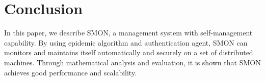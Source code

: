 \section{Conclusion}
\label{sec:conclusion}

In this paper, we describe SMON, a management system with
self-management capability. By using epidemic algorithm and
authentication agent, SMON can monitors and maintains itself
automatically and securely on a set of distributed machines.
Through mathematical analysis and evaluation, it is shown
that SMON achieves good performance and scalability.


